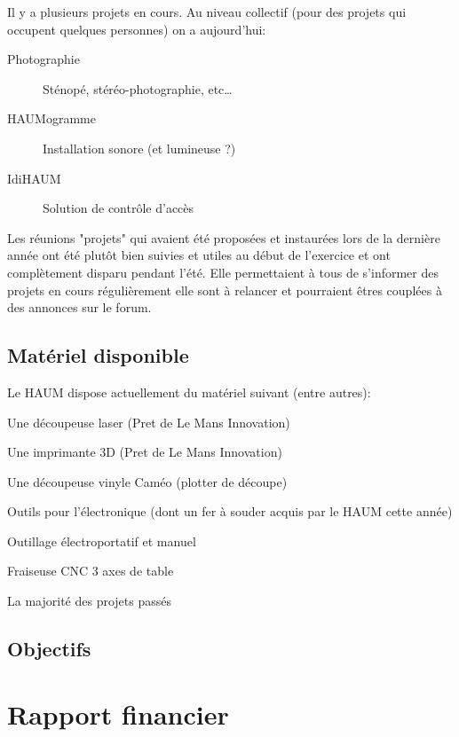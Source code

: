 \documentclass[11pt]{article}
\begin{document}
Il y a plusieurs projets en cours. Au niveau collectif (pour des projets qui occupent
quelques personnes) on a aujourd'hui:

\begin{description}
	\item[Photographie] Sténopé, stéréo-photographie, etc\ldots
    \item[HAUMogramme] Installation sonore (et lumineuse ?)
	\item[IdiHAUM\footnotemark] Solution de contrôle d'accès
\end{description}

Les réunions "projets" qui avaient été proposées et instaurées lors de la dernière année
ont été plutôt bien suivies et utiles au début de l'exercice et ont complètement disparu
pendant l'été. Elle permettaient à tous de s'informer des projets en cours régulièrement
elle sont à relancer et pourraient êtres couplées à des annonces sur le forum.

\subsection{Matériel disponible}

Le HAUM dispose actuellement du matériel suivant (entre autres):

\begin{description}
    \item Une découpeuse laser (Pret de Le Mans Innovation)
    \item Une imprimante 3D (Pret de Le Mans Innovation)
    \item Une découpeuse vinyle Caméo (plotter de découpe)
    \item Outils pour l'électronique (dont un fer à souder acquis par le HAUM cette année)
    \item Outillage électroportatif et manuel
    \item Fraiseuse CNC 3 axes de table
    \item La majorité des projets passés
\end{description}

\subsection{Objectifs}

\section{Rapport financier}
\end{document}
